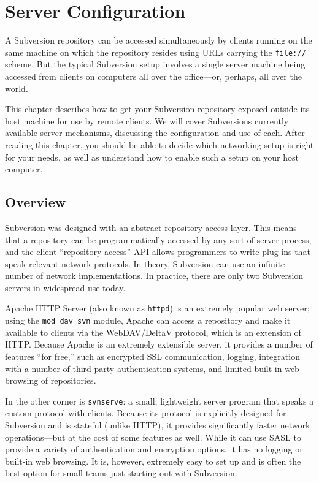 \chapter{Server Configuration}\label{svn.serverconfig}

A Subversion repository can be accessed simultaneously by clients
running on the same machine on which the repository resides using URLs
carrying the \texttt{file://} scheme. But the typical Subversion setup
involves a single server machine being accessed from clients on
computers all over the office---or, perhaps, all over the world.

This chapter describes how to get your Subversion repository exposed
outside its host machine for use by remote clients. We will cover
Subversion\textquotesingle s currently available server mechanisms,
discussing the configuration and use of each. After reading this
chapter, you should be able to decide which networking setup is right
for your needs, as well as understand how to enable such a setup on your
host computer.

\section{Overview}\label{svn.serverconfig.overview}

Subversion was designed with an abstract repository access layer. This
means that a repository can be programmatically accessed by any sort of
server process, and the client ``repository access'' API allows
programmers to write plug-ins that speak relevant network protocols. In
theory, Subversion can use an infinite number of network
implementations. In practice, there are only two Subversion servers in
widespread use today.

Apache HTTP Server (also known as \texttt{httpd}) is an extremely
popular web server; using the \texttt{mod\_dav\_svn} module, Apache can
access a repository and make it available to clients via the
WebDAV/DeltaV protocol, which is an extension of HTTP. Because Apache is
an extremely extensible server, it provides a number of features ``for
free,'' such as encrypted SSL communication, logging, integration with a
number of third-party authentication systems, and limited built-in web
browsing of repositories.

In the other corner is \texttt{svnserve}: a small, lightweight server
program that speaks a custom protocol with clients. Because its protocol
is explicitly designed for Subversion and is stateful (unlike HTTP), it
provides significantly faster network operations---but at the cost of
some features as well. While it can use SASL to provide a variety of
authentication and encryption options, it has no logging or built-in web
browsing. It is, however, extremely easy to set up and is often the best
option for small teams just starting out with Subversion.


